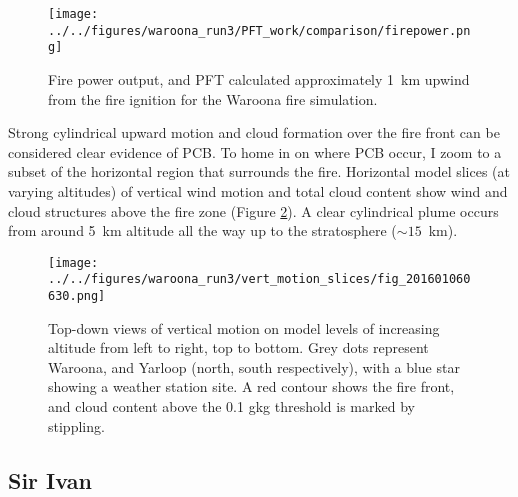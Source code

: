     \begin{figure}
      \texttt{[image: ../../figures/waroona\_run3/PFT\_work/comparison/firepower.png]}
      \caption{%
        Fire power output, and PFT calculated approximately 1~km upwind from the fire ignition for the Waroona fire simulation.
      }
      \label{fig:pcb:waroona:PFT}
    \end{figure}
    
    
    Strong cylindrical upward motion and cloud formation over the fire front can be considered clear evidence of PCB.
    To home in on where PCB occur, I zoom to a subset of the horizontal region that surrounds the fire. Horizontal model slices (at varying altitudes) of vertical wind motion and total cloud content show wind and cloud structures above the fire zone (Figure \ref{fig:pcb:waroona:vert_motion_slices}).
    A clear cylindrical plume occurs from around 5~km altitude all the way up to the stratosphere ($\sim 15$~km).
    
    \begin{figure}
      \texttt{[image: ../../figures/waroona\_run3/vert\_motion\_slices/fig\_201601060630.png]}
      \caption{%
        Top-down views of vertical motion on model levels of increasing altitude from left to right, top to bottom. 
        Grey dots represent Waroona, and Yarloop (north, south respectively), with a blue star showing a weather station site.
        A red contour shows the fire front, and cloud content above the 0.1 g\/kg threshold is marked by stippling.
        }
      \label{fig:pcb:waroona:vert_motion_slices}
    \end{figure}
    

    

  
  \subsection{Sir Ivan}
    \label{pcb:sirivan}
    